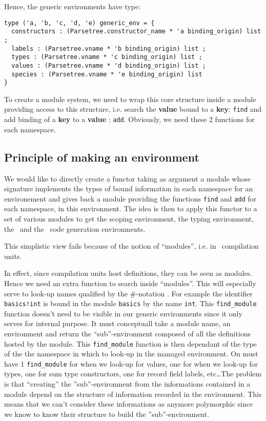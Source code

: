 Hence, the generic environments have type:
{\scriptsize
\begin{lstlisting}[language=MyOCaml]
type ('a, 'b, 'c, 'd, 'e) generic_env = {
  constructors : (Parsetree.constructor_name * 'a binding_origin) list ;
  labels : (Parsetree.vname * 'b binding_origin) list ;
  types : (Parsetree.vname * 'c binding_origin) list ;
  values : (Parsetree.vname * 'd binding_origin) list ;
  species : (Parsetree.vname * 'e binding_origin) list
}
\end{lstlisting}
}

To create a module system, we need to wrap this core structure inside
a module providing access to this structure, i.e. search the
{\bf value} bound to a {\bf key}: {\tt find} and add binding of a
{\bf key} to a {\bf value} : {\tt add}. Obviously, we need these 2
functions for each namespace.



\subsection{Principle of making an environment}
We would like to directly create a functor taking as argument a module
whose signature implements the types of bound information in each
namespace for an environement and gives back a module providing the
functions {\tt find} and {\tt add} for each namespace, in this
environment. The idea is then to apply this functor to a set of
various modules to get the scoping environment, the typing
environment, the \ocaml\ and the \coq\ code generation environments.

\medskip
This simplistic view fails because of the notion of ``modules'',
i.e. in \focalize\, compilation units.

In effect, since compilation units host definitions, they can be seen
as modules. Hence we need an extra function to search inside
``modules''. This will especially serve to look-up names qualified by
the \#-notation . For example the identifier {\tt basics!int} is bound
in the module {\tt basics} by the name {\tt int}. This
{\tt find\_module} function doesn't need to be visible in our generic
environments since it only serves for internal purpose. It must
conceptuall take a module name, an environment and return the
``sub''-environment composed of all the definitions hosted by the
module. This {\tt find\_module} function is then dependant of the type
of the the namespace in which to look-up in the managed environment.
On must have 1 {\tt find\_module} for when we look-up for values, one
for when we look-up for types, one for sum type constructors, one for
record field labels, etc\ldots The problem is that ``creating'' the
''sub''-environment from the informations contained in a module
depend on the structure of information recorded in the environment.
This means that we can't consider these informations as anymore
polymorphic since we know to know their structure to build the
''sub''-environment.

